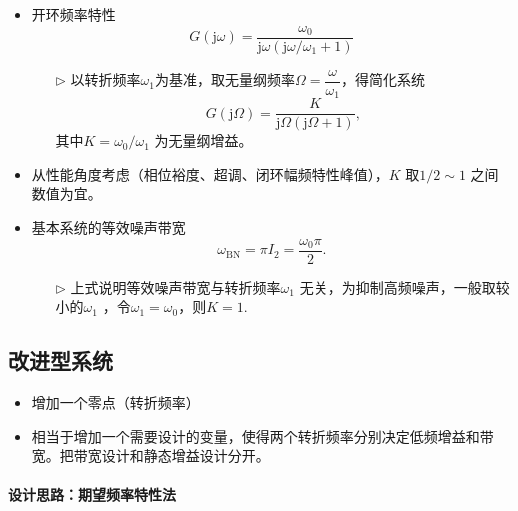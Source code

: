 \documentclass[14pt,a4paper]{article}
\theoremstyle{plain}
\theoremstyle{definition}
\theoremstyle{remark}
\theoremstyle{plain}
\theoremstyle{plain}
\theoremstyle{definition}
\begin{document}
			\begin{itemize}
				\item 开环频率特性
					\[
						G(\mathrm{j} \omega ) = \dfrac{\omega_0}{\mathrm{j} \omega \left( \mathrm{j} \omega / \omega_1 + 1 \right)} 
					\] 
				\begin{itemize}
				\item[$\triangleright$] 以转折频率$\omega_1$为基准，取无量纲频率$\Omega = \dfrac{\omega}{\omega_1}$，得简化系统
					\[
						G(\mathrm{j} \Omega ) = \dfrac{K}{\mathrm{j} \Omega (\mathrm{j} \Omega + 1)}
					,\] 
					其中$K=\omega_0 / \omega_1$ 为无量纲增益。  
				\end{itemize} 
				\item 从性能角度考虑（相位裕度、超调、闭环幅频特性峰值），$K$ 取$1 / 2 \sim 1$ 之间数值为宜。	
				\item 基本\uppercase\expandafter{}系统的等效噪声带宽
					\[
						\omega_{\text{BN}} = \pi I_2 = \frac{\omega_0 \pi}{2}
					.\]
					\begin{itemize}
						\item[$\triangleright$]	上式说明等效噪声带宽与转折频率$\omega_1$ 无关，为抑制高频噪声，一般取较小的$\omega_1$ ，令$\omega_1=\omega_0$，则$K=1$. 
					\end{itemize}  
			\end{itemize}  
		
		\subsection{改进\uppercase\expandafter{}型系统}%
		\label{sub:改进I型系统}
	
		\begin{itemize}
			\item 增加一个零点（转折频率）
			\item 相当于增加一个需要设计的变量，使得两个转折频率分别决定低频增益和带宽。把带宽设计和静态增益设计分开。
		\end{itemize}  

		\paragraph{设计思路：期望频率特性法}%
		\label{par:设计思路：期望频率特性法}
		
\end{document}
